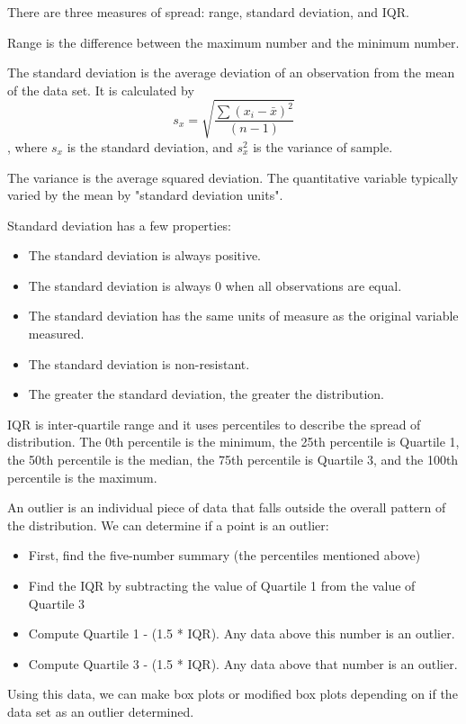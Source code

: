\documentclass[../stats.tex]{subfiles}
\begin{document}
There are three measures of spread: range, standard deviation, and IQR.

Range is the difference between the maximum number and the minimum number.

The standard deviation is the average deviation of an observation from the mean of the data set. 
It is calculated by 
\[s_x=\sqrt{\frac{\sum{(x_i-\bar{x})^2}}{(n-1)}}\]
, where $s_x$ is the standard deviation, and $s_x^2$ is the variance of sample.

The variance is the average squared deviation. The quantitative variable typically varied by the mean by "standard deviation units".

Standard deviation has a few properties:
\begin{itemize}
    \item The standard deviation is always positive.
    \item The standard deviation is always $0$ when all observations are equal.
    \item The standard deviation has the same units of measure as the original variable measured.
    \item The standard deviation is non-resistant.
    \item The greater the standard deviation, the greater the distribution.
\end{itemize}

IQR is inter-quartile range and it uses percentiles to describe the spread of distribution. 
The 0th percentile is the minimum, the 25th percentile is Quartile 1, the 50th percentile is the median, 
the 75th percentile is Quartile 3, and the 100th percentile is the maximum.

An outlier is an individual piece of data that falls outside the overall pattern of the distribution. We can determine if a point is an outlier:
\begin{itemize}
    \item First, find the five-number summary (the percentiles mentioned above)
    \item Find the IQR by subtracting the value of Quartile 1 from the value of Quartile 3
    \item Compute Quartile 1 - (1.5 * IQR). Any data above this number is an outlier.
    \item Compute Quartile 3 - (1.5 * IQR). Any data above that number is an outlier. 
\end{itemize}

Using this data, we can make box plots or modified box plots depending on if the data set as an outlier determined.
\end{document}
